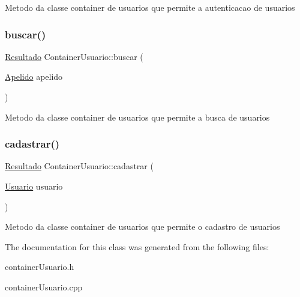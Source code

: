 Metodo da classe container de usuarios que permite a autenticacao de usuarios \mbox{\label{classContainerUsuario_ae25b805fee893e20b85a501e1ba4d252}} 
\subsubsection{\texorpdfstring{buscar()}{buscar()}}
{\footnotesize\ttfamily \hyperlink{classResultado}{Resultado} Container\+Usuario\+::buscar (\begin{DoxyParamCaption}\item[{\hyperlink{classApelido}{Apelido}}]{apelido }\end{DoxyParamCaption})}

Metodo da classe container de usuarios que permite a busca de usuarios \mbox{\label{classContainerUsuario_a650844004136d741ede5c5a38d3dae3b}} 
\subsubsection{\texorpdfstring{cadastrar()}{cadastrar()}}
{\footnotesize\ttfamily \hyperlink{classResultado}{Resultado} Container\+Usuario\+::cadastrar (\begin{DoxyParamCaption}\item[{\hyperlink{classUsuario}{Usuario}}]{usuario }\end{DoxyParamCaption})}

Metodo da classe container de usuarios que permite o cadastro de usuarios 

The documentation for this class was generated from the following files\+:\begin{DoxyCompactItemize}
\item 
container\+Usuario.\+h\item 
container\+Usuario.\+cpp\end{DoxyCompactItemize}
